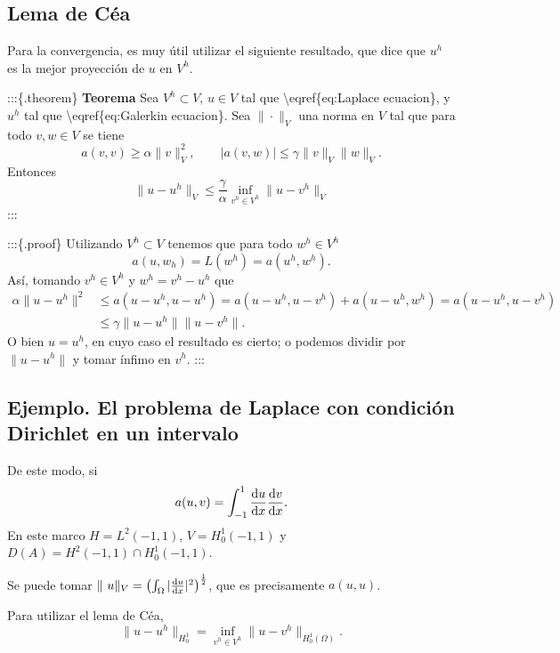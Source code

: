 \subsection{Lema de Céa
}\label{lema-de-cuxe9a-scrollable}

Para la convergencia, es muy útil utilizar el siguiente resultado, que
dice que \(u^h\) es la mejor proyección de \(u\) en \(V^h\).

:::\{.theorem\} \textbf{Teorema} Sea \(V^h \subset V\), \(u \in V\) tal
que \textbackslash eqref\{eq:Laplace ecuacion\}, y \(u^h\) tal que
\textbackslash eqref\{eq:Galerkin ecuacion\}. Sea \(\| \cdot \|_V\) una
norma en \(V\) tal que para todo \(v, w \in V\) se tiene \[
    a(v, v) \ge \alpha \|v \|^2_V,
    \qquad
    |a(v,w) | \le \gamma \|v\|_V \|w \|_V.
\] Entonces \[
    \| u - u^h \|_V \le \frac{\gamma}{\alpha} \inf_{v^h \in V^h} \|u - v^h\|_V
\] :::

:::\{.proof\} Utilizando \(V^h \subset V\) tenemos que para todo
\(w^h \in V^h\) \[
    a(u, w_h) = L(w^h) = a(u^h,w^h) .
\] Así, tomando \(v^h \in V^h\) y \(w^h = v^h - u^h\) que
\[\begin{aligned}
        \alpha \|u - u^h\|^2 & \le a(u-u^h, u-u^h) = a(u-u^h, u - v^h) + a(u-u^h , w^h ) = a(u-u^h, u - v^h) \\
                             & \le \gamma \|u - u^h\| \| u - v^h\|.
    \end{aligned}
\] O bien \(u = u^h\), en cuyo caso el resultado es cierto; o podemos
dividir por \(\|u - u^h\|\) y tomar ínfimo en \(v^h\). :::

\subsection{Ejemplo. El problema de Laplace con condición Dirichlet en
    un intervalo
}\label{ejemplo-el-problema-de-laplace-con-condiciuxf3n-dirichlet-en-un-intervalo-scrollable}

De este modo, si \[
    a(u,v) = \int_{-1}^1 \frac{\mathrm{d} u}{\mathrm{d} x} \frac{\mathrm{d} v}{\mathrm{d} x}.
\] En este marco \(H = L^2 (-1,1)\), \(V = H_0^1(-1,1)\) y
\(D(A) = H^2 (-1,1) \cap H_0^1 (-1,1)\).

Se puede tomar
\(\| u \|_V = \left( \int_\Omega |\frac{\diff u}{\diff x}|^2 \right)^{\frac 1 2}\),
que es precisamente \(a(u,u)\).

Para utilizar el lema de Céa, \[
    \| u - u^h \|_{H^1_0 } = \inf_{v^h \in V^h} \| u - v^h \|_{H_0^1 (\Omega)}.
\]

